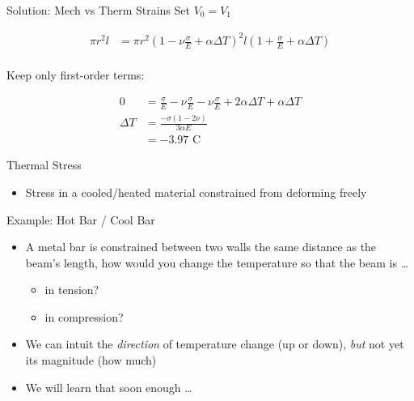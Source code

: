 \documentclass[10pt, svgnames]{beamer}
\begin{document}
\begin{frame}[label={sec:org15e61ac}]{Solution: Mech vs Therm Strains}
Set \(V_0 = V_{1}\)

\begin{align*}
    \pi r^{2} l &= \pi r^{2}\left(1 - \nu \frac{\sigma}{E} + \alpha \Delta T \right)^{2} l\left( 1 + \frac{\sigma}{E} + \alpha \Delta T \right) \\
\end{align*}

Keep only first-order terms:

\begin{align*}
    0 &= \frac{\sigma}{E} -\nu \frac{\sigma}{E} -\nu \frac{\sigma}{E} + 2\alpha \Delta T + \alpha \Delta T \\
    \Delta T &= \frac{-\sigma(1 - 2 \nu)}{3 \alpha E} \\
      &= -3.97 \text{ C}
\end{align*}
\end{frame}

\begin{frame}[label={sec:orgc33257e}]{Thermal Stress}
\begin{itemize}
\item Stress in a cooled/heated material constrained from deforming freely
\end{itemize}
\end{frame}

\begin{frame}[label={sec:orga3ee063}]{Example: Hot Bar / Cool Bar}
\begin{itemize}
\item A metal bar is constrained between two walls the same distance as the
beam's length, how would you change the temperature so that the beam
is \ldots{}

\begin{itemize}
\item in tension?

\item in compression?
\end{itemize}

\item We can intuit the \emph{direction} of temperature change (up or down),
\emph{but} not yet its magnitude (how much)

\item We will learn that soon enough \ldots{}
\end{itemize}
\end{frame}
\end{document}
